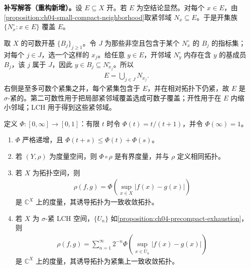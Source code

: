 \documentclass[../../main.tex]{subfiles}%
\begin{document}
\begin{solution}
\textbf{补写解答（重构新增）。}设 $E\subseteq X$ 开。若 $E$ 为空结论显然。对每个 $x\in E$，由\cref{proposition:ch04-small-compact-neighborhood}取紧邻域 $N_x\subseteq E$。于是开集族 $\{N_x^\circ:x\in E\}$ 覆盖 $E$。

取 $X$ 的可数开基 $\{B_j\}_{j\ge1}$。令 $J$ 为那些非空且包含于某个 $N_x^\circ$ 的 $B_j$ 的指标集；对每个 $j\in J$，选一个这样的 $x_j$。给任意 $y\in E$，开邻域 $N_y^\circ$ 内存在含 $y$ 的基成员 $B_j$，该 $j$ 属于 $J$，因此 $y\in B_j\subseteq N_{x_j}^\circ$。所以
\begin{align*}
E=\bigcup_{j\in J}N_{x_j}.
\end{align*}
右侧是至多可数个紧集之并，每个紧集包含于 $E$，并在相对拓扑下仍紧，故 $E$ 是 $\sigma$-紧的。第二可数性用于把局部紧邻域覆盖选成可数子覆盖；开性用于在 $E$ 内缩小邻域；LCH 用于得到这些紧邻域。
\end{solution}
\begin{exercise}\label{exercise:ch04-bounded-function-metrics}
定义 $\Phi:[0,\infty]\to[0,1]$：有限 $t$ 时令 $\Phi(t)=t/(t+1)$，并令 $\Phi(\infty)=1$。
\begin{enumerate}
\item\label{item:ch04-phi-subadditive} $\Phi$ 严格递增，且 $\Phi(t+s)\le\Phi(t)+\Phi(s)$。
\item\label{item:ch04-bounded-metric} 若 $(Y,\rho)$ 为度量空间，则 $\Phi\circ\rho$ 是有界度量，并与 $\rho$ 定义相同拓扑。
\item\label{item:ch04-uniform-function-metric} 若 $X$ 为拓扑空间，则
\begin{align*}
\rho(f,g)=\Phi\left(\sup_{x\in X}|f(x)-g(x)|\right)
\end{align*}
是 $\mathbb C^X$ 上的度量，其诱导拓扑为一致收敛拓扑。
\item\label{item:ch04-compact-uniform-function-metric} 若 $X$ 为 $\sigma$-紧 LCH 空间，$\{U_n\}$ 如\cref{proposition:ch04-precompact-exhaustion}，则
\begin{align*}
\rho(f,g)=\sum_{n=1}^{\infty}2^{-n}\Phi\left(\sup_{x\in\overline U_n}|f(x)-g(x)|\right)
\end{align*}
是 $\mathbb C^X$ 上的度量，其诱导拓扑为紧集上一致收敛拓扑。
\end{enumerate}
\end{exercise}
\end{document}
